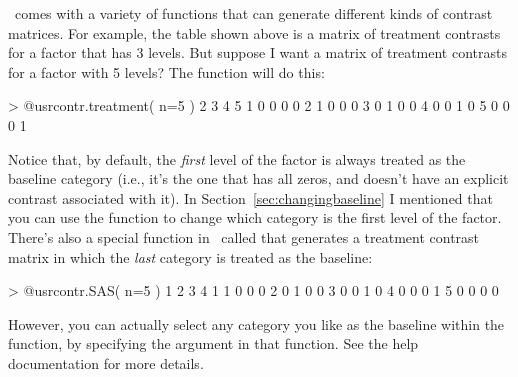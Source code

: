 \R\ comes with a variety of functions that can generate different kinds of contrast matrices. For example, the table shown above is a matrix of treatment contrasts for a factor that has 3 levels. But suppose I want a matrix of treatment contrasts for a factor with 5 levels? The  function will do this:
\begin{rblock1}
> @usr{contr.treatment( n=5 )}
  2 3 4 5
1 0 0 0 0
2 1 0 0 0
3 0 1 0 0
4 0 0 1 0
5 0 0 0 1
\end{rblock1}
Notice that, by default, the {\it first} level of the factor is always treated as the baseline category (i.e., it's the one that has all zeros, and doesn't have an explicit contrast associated with it). In Section~\ref{sec:changingbaseline} I mentioned that you can use the  function to change which category is the first level of the factor. There's also a special function in \R\ called  that generates a treatment contrast	 matrix in which the {\it last} category is treated as the baseline:
\begin{rblock1}
> @usr{contr.SAS( n=5 )}
  1 2 3 4
1 1 0 0 0
2 0 1 0 0
3 0 0 1 0
4 0 0 0 1
5 0 0 0 0
\end{rblock1}
However, you can actually select any category you like as the baseline within the  function, by specifying the  argument in that function. See the help documentation for more details.


